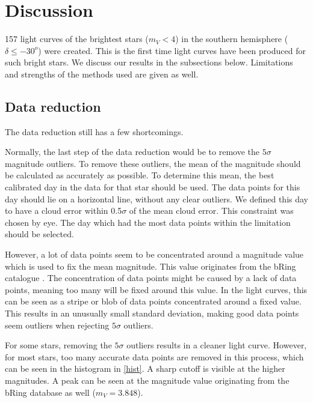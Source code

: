\documentclass[onecolumn]{aa} %
\begin{document}
  
\section{Discussion}
\label{sec:discussion}

157 light curves of the brightest stars ($m_V < 4$) in the southern hemisphere ($\delta \leq -30^o$) were created. This is the first time light curves have been produced for such bright stars. We discuss our results in the subsections below. Limitations and strengths of the methods used are given as well.

\subsection{Data reduction}
\label{sec:discdatared}
The data reduction still has a few shortcomings.

Normally, the last step of the data reduction would be to remove the $5 \sigma$ magnitude outliers. To remove these outliers, the mean of the magnitude should be calculated as accurately as possible. To determine this mean, the best calibrated day in the data for that star should be used. The data points for this day should lie on a horizontal line, without any clear outliers. We defined this day to have a cloud error within 0.5$\sigma$ of the mean cloud error. This constraint was chosen by eye. The day which had the most data points within the limitation should be selected.

However, a lot of data points seem to be concentrated around a magnitude value which is used to fix the mean magnitude. This value originates from the bRing catalogue \citep{Talens_2018}. The concentration of data points might be caused by a lack of data points, meaning too many will be fixed around this value. In the light curves, this can be seen as a stripe or blob of data points concentrated around a fixed value. This results in an unusually small standard deviation, making good data points seem outliers when rejecting $5\sigma$ outliers.

For some stars, removing the $5 \sigma$ outliers results in a cleaner light curve. However, for most stars, too many accurate data points are removed in this process, which can be seen in the histogram in \ref{hist}. A sharp cutoff is visible at the higher magnitudes. A peak can be seen at the magnitude value originating from the bRing database as well ($m_V = 3.848$).
\end{document}
